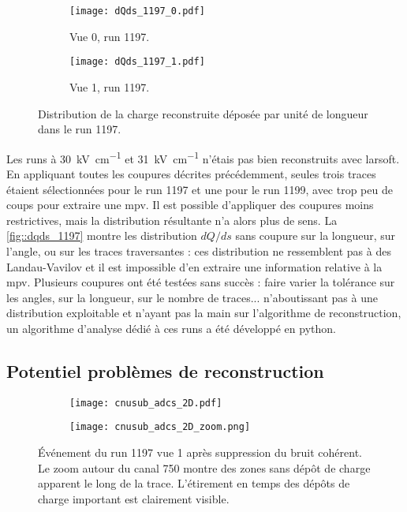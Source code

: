     \begin{figure}[htbp]
      \centering
      \begin{subfigure}[t]{0.48\textwidth}
        \centering
        \texttt{[image: dQds\_1197\_0.pdf]}
        \caption[]{Vue 0, run 1197.}
      \end{subfigure}\hfill
      \begin{subfigure}[t]{0.48\textwidth}
        \centering
        \texttt{[image: dQds\_1197\_1.pdf]}
        \caption[]{Vue 1, run 1197.}
      \end{subfigure}
      \caption[Distribution de la charge déposée par unité de longueur dans le \TOO{}.]{\label{fig::dqds_1197}Distribution de la charge reconstruite déposée par unité de longueur dans le run 1197.}
    \end{figure}

    Les runs à \SI{30}{\kilo\volt\per\centi\meter} et \SI{31}{\kilo\volt\per\centi\meter} n'étais pas bien reconstruits avec \gls{larsoft}. En appliquant toutes les coupures décrites précédemment, seules trois traces étaient sélectionnées pour le run 1197 et une pour le run 1199, avec trop peu de coups pour extraire une \gls{mpv}. Il est possible d'appliquer des coupures moins restrictives, mais la distribution résultante n'a alors plus de sens. La \autoref{fig::dqds_1197} montre les distribution $dQ/ds$ sans coupure sur la longueur, sur l'angle, ou sur les traces traversantes : ces distribution ne ressemblent pas à des Landau-Vavilov et il est impossible d'en extraire une information relative à la \gls{mpv}. Plusieurs coupures ont été testées sans succès : faire varier la tolérance sur les angles, sur la longueur, sur le nombre de traces... n'aboutissant pas à une distribution exploitable et n'ayant pas la main sur l'algorithme de reconstruction, un algorithme d'analyse dédié à ces runs a été développé en python.

    \subsection{Potentiel problèmes de reconstruction}

      \begin{figure}[htbp]
        \centering
        \begin{subfigure}[t]{0.8\textwidth}
          \centering
          \texttt{[image: cnusub\_adcs\_2D.pdf]}
        \end{subfigure}\hfill
        \begin{subfigure}[t]{0.19\textwidth}
          \centering
          \texttt{[image: cnusub\_adcs\_2D\_zoom.png]}
        \end{subfigure}
        \caption[Événement du run 1197 vue 1 après suppression du bruit cohérent.]{\label{fig::cnusub_adcs_2D}Événement du run 1197 vue 1 après suppression du bruit cohérent. Le zoom autour du canal 750 montre des zones sans dépôt de charge apparent le long de la trace. L'étirement en temps des dépôts de charge important est clairement visible.}
      \end{figure}

